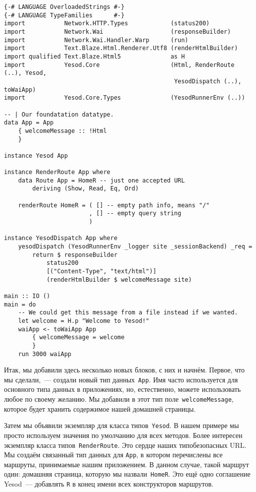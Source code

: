 \begin{lstlisting}
{-# LANGUAGE OverloadedStrings #-}
{-# LANGUAGE TypeFamilies      #-}
import           Network.HTTP.Types            (status200)
import           Network.Wai                   (responseBuilder)
import           Network.Wai.Handler.Warp      (run)
import           Text.Blaze.Html.Renderer.Utf8 (renderHtmlBuilder)
import qualified Text.Blaze.Html5              as H
import           Yesod.Core                    (Html, RenderRoute (..), Yesod,
                                                YesodDispatch (..), toWaiApp)
import           Yesod.Core.Types              (YesodRunnerEnv (..))

-- | Our foundatation datatype.
data App = App
    { welcomeMessage :: !Html
    }

instance Yesod App

instance RenderRoute App where
    data Route App = HomeR -- just one accepted URL
        deriving (Show, Read, Eq, Ord)

    renderRoute HomeR = ( [] -- empty path info, means "/"
                        , [] -- empty query string
                        )

instance YesodDispatch App where
    yesodDispatch (YesodRunnerEnv _logger site _sessionBackend) _req =
        return $ responseBuilder
            status200
            [("Content-Type", "text/html")]
            (renderHtmlBuilder $ welcomeMessage site)

main :: IO ()
main = do
    -- We could get this message from a file instead if we wanted.
    let welcome = H.p "Welcome to Yesod!"
    waiApp <- toWaiApp App
        { welcomeMessage = welcome
        }
    run 3000 waiApp
\end{lstlisting}

Итак, мы добавили здесь несколько новых блоков, с них и начнём. Первое, что мы
сделали,~--- создали новый тип данных~\lstinline'App'. Имя часто используется
для основного типа данных в приложениях, но, естественно, можете использовать
любое по своему желанию. Мы добавили в этот тип
поле~\lstinline'welcomeMessage', которое будет хранить содержимое нашей
домашней страницы.

Затем мы объявили экземпляр для класса типов~\lstinline'Yesod'. В нашем примере
мы просто используем значения по умолчанию для всех методов. Более интересен
экземпляр класса типов~\lstinline'RenderRoute'. Это сердце наших типобезопасных
URL. Мы создаём связанный тип данных для \lstinline'App', в котором перечислены
все маршруты, принимаемые нашим приложением. В данном случае, такой маршрут
один: домашняя страница, которую мы назвали~\lstinline'HomeR'. Это ещё одно
соглашение Yesod~--- добавлять \lstinline'R' в конец имени всех конструкторов
маршрутов.

